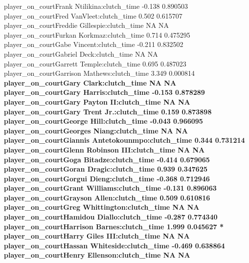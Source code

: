 \documentclass[
  landscape]{article}
\begin{document}
{player\_on\_courtFrank Ntilikina:clutch\_time -0.138 0.890503\\
player\_on\_courtFred VanVleet:clutch\_time 0.502 0.615707\\
player\_on\_courtFreddie Gillespie:clutch\_time NA NA\\
player\_on\_courtFurkan Korkmaz:clutch\_time 0.714 0.475295\\
player\_on\_courtGabe Vincent:clutch\_time -0.211 0.832502\\
player\_on\_courtGabriel Deck:clutch\_time NA NA\\
player\_on\_courtGarrett Temple:clutch\_time 0.695 0.487023\\
player\_on\_courtGarrison Mathews:clutch\_time 3.349 0.000814 }\textbf{
player\_on\_courtGary Clark:clutch\_time NA NA\\
player\_on\_courtGary Harris:clutch\_time -0.153 0.878289\\
player\_on\_courtGary Payton II:clutch\_time NA NA\\
player\_on\_courtGary Trent Jr.:clutch\_time 0.159 0.873898\\
player\_on\_courtGeorge Hill:clutch\_time -0.043 0.966095\\
player\_on\_courtGeorges Niang:clutch\_time NA NA\\
player\_on\_courtGiannis Antetokounmpo:clutch\_time 0.344 0.731214\\
player\_on\_courtGlenn Robinson III:clutch\_time NA NA\\
player\_on\_courtGoga Bitadze:clutch\_time -0.414 0.679065\\
player\_on\_courtGoran Dragic:clutch\_time 0.939 0.347625\\
player\_on\_courtGorgui Dieng:clutch\_time -0.368 0.712946\\
player\_on\_courtGrant Williams:clutch\_time -0.131 0.896063\\
player\_on\_courtGrayson Allen:clutch\_time 0.509 0.610816\\
player\_on\_courtGreg Whittington:clutch\_time NA NA\\
player\_on\_courtHamidou Diallo:clutch\_time -0.287 0.774340\\
player\_on\_courtHarrison Barnes:clutch\_time 1.999 0.045627 *\\
player\_on\_courtHarry Giles III:clutch\_time NA NA\\
player\_on\_courtHassan Whiteside:clutch\_time -0.469 0.638864\\
player\_on\_courtHenry Ellenson:clutch\_time NA NA\\
}
\end{document}
